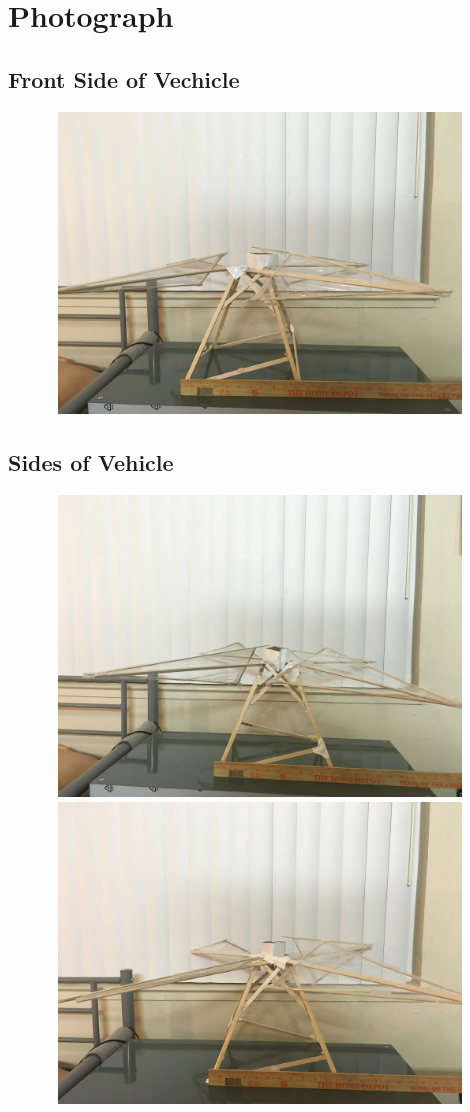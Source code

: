 \documentclass[12pt]{report}
\begin{document}
\chapter{Photograph}
\section{Front Side of Vechicle}
\includegraphics[width=15cm, height=8cm]{front}
\section{Sides of Vehicle}
\includegraphics[width=15cm, height=8cm]{side}
\newline \newline
\includegraphics[width=15cm, height=8cm]{side2}
\end{document}
